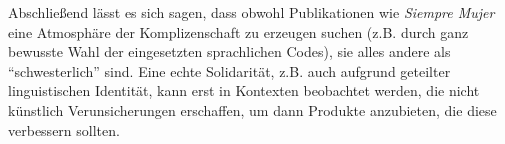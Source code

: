 Abschließend lässt es sich sagen, dass obwohl Publikationen wie \textit{Siempre Mujer} eine Atmosphäre der Komplizenschaft zu erzeugen suchen (z.B. durch ganz bewusste Wahl der eingesetzten sprachlichen Codes), sie alles andere als ``schwesterlich'' sind.
Eine echte Solidarität, z.B. auch aufgrund geteilter linguistischen Identität, kann erst in Kontexten beobachtet werden, die nicht künstlich Verunsicherungen erschaffen, um dann Produkte anzubieten, die diese verbessern sollten.


\begin{comment}
    ``Frauenzeitschriften'' als ``synthetic sisterhood''
\cite{Talbot95}
"how this imaginary community is established: the simulation of a friendly relationship. I conclude with some discussion of how "unsisterly" this feature really is"

"This discursively organized social space called femininity is articulated in commercial and mass-media discourses — especiall in the magazine, clothng, and cosmetics industries."

"Readers are drawn into a kind of complicity with the texts they read."

"In the late 1930s, magazines began to carry consumer features, in which advertising is presented as part of the editorial content. As this brief history suggests, the women's magazine has developed in the context of patriarchal and capitalist social relations."

"Of particular relevance here is women's work on their own bodies as objects to be looked at and their use of commodities, tha is, women's activities as consumers who feminize themselves. Magazines for women contain informative and facilitative elements on fahion and beauty products and their use, which appear both in advertisements and in sonsumer features produced by the editorial board."

"An important element of feminizing practices is the concept of a woman as a visible object requiring work."

"This itemization has been intensified by an endless proliferation of products by manufacturers and accompanying distinctions among colors, sking types, hair types, and so on."

"Magazines are therefore constructed within the relationship among staff, publisher, and manufacturers;"

"According to Angela McRobbie (1978:3; original emphasis), \textit{Jackie} presented its teenage readers with a "\textit{false} sisterhood" and imposed an ideology of femininity that isolated women from one another; "(1) The girls are being invited to join a close, intimate sorority where secrets can be exchanged and advice given; and (2) they are also being presnted with an ideological bloc of mammoth proportions, one which \textit{imprisons} them in a claustrophobic world of jealousy and competitiveness, the most unsisterly of emotions, to say the least.""


\end{comment}
